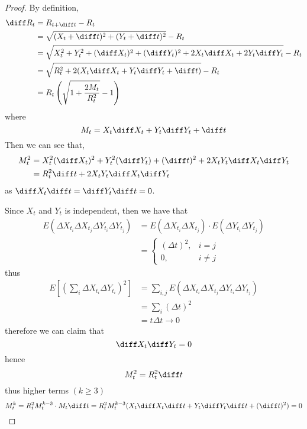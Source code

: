     \problem
    \begin{proof}
        By definition,
        \[\begin{aligned}
            \diff R_t&=R_{t+\diff t}-R_t\\
            &=\sqrt{(X_t+\diff t)^2+(Y_t+\diff t)^2}-R_t\\
            &=\sqrt{X_t^2+Y_t^2+(\diff X_t)^2+(\diff Y_t)^2
            +2X_t\diff X_t+2Y_t\diff Y_t}-R_t\\
            &=\sqrt{R_t^2+2(X_t\diff X_t+Y_t\diff Y_t+\diff t)}-R_t\\
            &=R_t\left(\sqrt{1+\frac{2M_t}{R_t^2}}-1\right)
        \end{aligned}\]
        where
        \[M_t=X_t\diff X_t+Y_t\diff Y_t+\diff t\]
        Then we can see that,
        \[\begin{aligned}
            M_t^2&=X_t^2(\diff X_t)^2+Y_t^2(\diff Y_t)+(\diff t)^2
            +2X_tY_t\diff X_t\diff Y_t\\
            &=R_t^2\diff t+2X_tY_t\diff X_t\diff Y_t
        \end{aligned}\]
        as $\diff X_t\diff t=\diff Y_t\diff t=0$.

        Since $X_t$ and $Y_t$ is independent, then we have that
        \[\begin{aligned}
            E\left(\Delta X_{t_i}\Delta X_{t_j}
                   \Delta Y_{t_i}\Delta Y_{t_j}\right)
            &=E\left(\Delta X_{t_i}\Delta X_{t_j}\right)\cdot
              E\left(\Delta Y_{t_i}\Delta Y_{t_j}\right)\\
            &=\begin{cases}
                (\Delta t)^2,&i=j\\
                0,&i\neq j
            \end{cases}
        \end{aligned}\]
        thus
        \[\begin{aligned}
            E\left[\left(\sum_i\Delta X_{t_i}\Delta Y_{t_i}\right)^2\right]
            &=\sum_{i,j}
            E\left(\Delta X_{t_i}\Delta X_{t_j}
                   \Delta Y_{t_i}\Delta Y_{t_j}\right)\\
            &=\sum_{i}(\Delta t)^2\\
            &=t\Delta t\to 0
        \end{aligned}\]
        therefore we can claim that
        \[\diff X_t\diff Y_t=0\]
        hence
        \begin{equation}
            \label{eq:magic equation}
            M_t^2=R_t^2\diff t
        \end{equation}
        thus higher terms $(k\geq 3)$
        \[M_t^k=R_t^2M_t^{k-3}\cdot M_t\diff t
        =R_t^2M_t^{k-3}(X_t\diff X_t\diff t+Y_t\diff Y_t\diff t+(\diff t)^2)
        =0\]


\end{proof}

